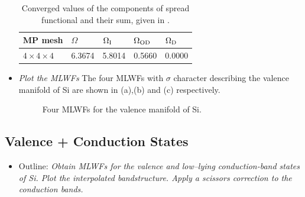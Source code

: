 \begin{itemize}
\begin{table}[t!]
\centering
\caption{Converged values of the components of spread functional and their sum, given in \angsqd{}.}
\begin{tabular}{@{} lllll @{}}\toprule[1.5pt]
MP mesh & $\Omega$ & $\Omega\tinysub{I}$ & $\Omega\tinysub{OD}$ & $\Omega\tinysub{D}$ \\\midrule
$4\times4\times4$ & 6.3674  &  5.8014 & 0.5660 & 0.0000 \\\bottomrule
\end{tabular}\label{tab11.1}
\end{table}

\item {\it Plot the MLWFs}
The four MLWFs with $\sigma$ character describing the valence manifold of Si are shown in (a),(b) and (c) respectively.
	\begin{figure}[h!]
	\centering
	\centering
	\centering
	\centering
	\caption{Four MLWFs for the valence manifold of Si.}\label{fig11.1}
	\end{figure}

\end{itemize}
\newpage
\subsection*{Valence + Conduction States}
\begin{itemize}
\item Outline: {\it Obtain MLWFs for the valence and low--lying conduction-band states of Si. Plot the
interpolated bandstructure. Apply a scissors correction to the conduction bands.}
\end{itemize}

